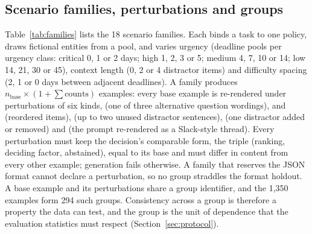 \subsection{Scenario families, perturbations and groups}
Table~\ref{tab:families} lists the 18 scenario families. Each binds a task to one policy, draws fictional entities from a pool, and varies urgency (deadline pools per urgency class: critical 0, 1 or 2 days; high 1, 2, 3 or 5; medium 4, 7, 10 or 14; low 14, 21, 30 or 45), context length (0, 2 or 4 distractor items) and difficulty spacing (2, 1 or 0 days between adjacent deadlines). A family produces $n_{\text{base}} \times (1 + \sum \text{counts})$ examples: every base example is re-rendered under perturbations of six kinds,  (one of three alternative question wordings),  and  (reordered items),  (up to two unused distractor sentences),  (one distractor added or removed) and  (the prompt re-rendered as a Slack-style thread). Every perturbation must keep the decision's comparable form, the triple (ranking, deciding factor, abstained), equal to its base and must differ in content from every other example; generation fails otherwise. A family that reserves the JSON format cannot declare a  perturbation, so no group straddles the format holdout. A base example and its perturbations share a group identifier, and the 1,350 examples form 294 such groups. Consistency across a group is therefore a property the data can test, and the group is the unit of dependence that the evaluation statistics must respect (Section~\ref{sec:protocol}).

